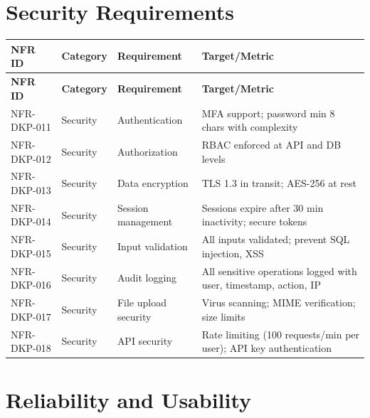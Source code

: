 \documentclass[12pt,a4paper]{report}
\begin{document}
\section{Security Requirements}

\begin{longtable}{|p{2cm}|p{3cm}|p{5.5cm}|p{3.5cm}|}
\hline
\textbf{NFR ID} & \textbf{Category} & \textbf{Requirement} & \textbf{Target/Metric} \\ \hline
\endfirsthead
\hline
\textbf{NFR ID} & \textbf{Category} & \textbf{Requirement} & \textbf{Target/Metric} \\ \hline
\endhead
NFR-DKP-011 & Security & Authentication & MFA support; password min 8 chars with complexity \\ \hline
NFR-DKP-012 & Security & Authorization & RBAC enforced at API and DB levels \\ \hline
NFR-DKP-013 & Security & Data encryption & TLS 1.3 in transit; AES-256 at rest \\ \hline
NFR-DKP-014 & Security & Session management & Sessions expire after 30 min inactivity; secure tokens \\ \hline
NFR-DKP-015 & Security & Input validation & All inputs validated; prevent SQL injection, XSS \\ \hline
NFR-DKP-016 & Security & Audit logging & All sensitive operations logged with user, timestamp, action, IP \\ \hline
NFR-DKP-017 & Security & File upload security & Virus scanning; MIME verification; size limits \\ \hline
NFR-DKP-018 & Security & API security & Rate limiting (100 requests/min per user); API key authentication \\ \hline
\end{longtable}

\section{Reliability and Usability}
\end{document}
